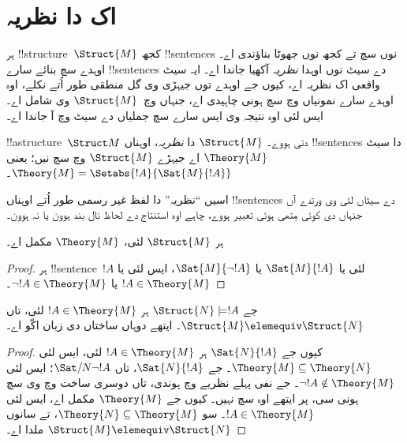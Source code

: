 \documentclass[../../../include/open-logic-section]{subfiles}
\begin{document}

\section{اک  دا نظریہ}

ہر !!{structure}~$\Struct{M}$ کجھ !!{sentence}s نوں سچ تے کجھ نوں
جھوٹا بناؤندی اے۔ اوہدے سچ بنائے سارے !!{sentence}s دے سیٹ نوں
اوہدا \emph{نظریہ} آکھیا جاندا اے۔ ایہ سیٹ واقعی اک نظریہ اے، کیوں جے
اوہدے توں جیہڑی وی گل منطقی طور اُتے نکلے، اوہ اوہدے سارے نمونیاں
وچ سچ ہونی چاہیدی اے، جنہاں وچ~$\Struct{M}$ وی شامل اے۔ ایس لئی
اوہ نتیجہ وی ایس سارے سچ جملیاں دے سیٹ وچ آ جاندا اے۔

\begin{defn}
  !!a{structure}~$\Struct M$ دتی ہووے۔ $\Struct{M}$ دا
  \emph{نظریہ}، اوہناں !!{sentence}s دا سیٹ $\Theory{M}$ اے
  جیہڑے $\Struct{M}$ وچ سچ نیں؛ یعنی $\Theory{M} =
  \Setabs{!A}{\Sat{M}{!A}}$۔
\end{defn}

اسیں ``نظریہ'' دا لفظ غیر رسمی طور اُتے اوہناں !!{sentence}s دے
سیٹاں لئی وی ورتدے آں جنہاں دی کوئی مِتھی ہوئی تعبیر ہووے، چاہے اوہ
استنتاج دے لحاظ نال بند ہوون یا نہ ہوون۔

\begin{prop}
ہر $\Struct{M}$ لئی، $\Theory{M}$ مکمل اے۔
\end{prop}

\begin{proof}
ہر !!{sentence}~$!A$ لئی یا $\Sat{M}{!A}$ یا $\Sat{M}{\lnot !A}$،
ایس لئی یا $!A \in \Theory{M}$ یا $\lnot !A \in \Theory{M}$۔
\end{proof}

\begin{prop}
  جے $\Struct{N} \models !A$ ہر $!A \in \Theory{M}$ لئی، تاں
  $\Struct{M} \elemequiv \Struct{N}$۔ ایتھے دوہاں ساختاں دی زبان اکّو اے۔
\end{prop}

\begin{proof}
کیوں جے $\Sat{N}{!A}$ ہر $!A \in \Theory{M}$ لئی، ایس لئی
$\Theory{M} \subseteq \Theory{N}$۔ جے $\Sat{N}{!A}$، تاں
$\Sat/{N}{\lnot !A}$؛ ایس لئی $\lnot !A
\notin \Theory{M}$۔ جے نفی پہلے نظریے وچ ہوندی، تاں دوسری ساخت وچ وی
سچ ہونی سی، پر ایتھے اوہ سچ نہیں۔ کیوں جے $\Theory{M}$ مکمل اے، ایس لئی $!A \in
\Theory{M}$۔ سو $\Theory{N} \subseteq \Theory{M}$، تے سانوں
$\Struct{M} \elemequiv \Struct{N}$ ملدا اے۔
\end{proof}
\end{document}
